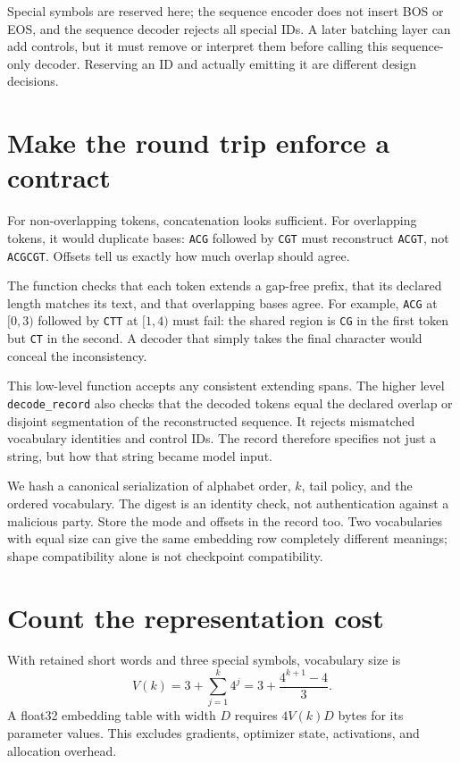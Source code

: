 Special symbols are reserved here; the sequence encoder does not insert
BOS or EOS, and the sequence decoder rejects all special IDs. A later
batching layer can add controls, but it must remove or interpret them
before calling this sequence-only decoder. Reserving an ID and actually
emitting it are different design decisions.

\section{Make the round trip enforce a contract}

For non-overlapping tokens, concatenation looks sufficient. For overlapping
tokens, it would duplicate bases: \texttt{ACG} followed by \texttt{CGT}
must reconstruct \texttt{ACGT}, not \texttt{ACGCGT}.
Offsets tell us exactly how much overlap should agree.


The function checks that each token extends a gap-free prefix, that its
declared length matches its text, and that overlapping bases agree.
For example, \texttt{ACG} at $[0,3)$ followed by \texttt{CTT} at $[1,4)$
must fail: the shared region is \texttt{CG} in the first token but
\texttt{CT} in the second. A decoder that simply takes the final character
would conceal the inconsistency.

This low-level function accepts any consistent extending spans. The higher
level \texttt{decode\_record} also checks that the decoded tokens equal the
declared overlap or disjoint segmentation of the reconstructed sequence.
It rejects mismatched vocabulary identities and control IDs. The record
therefore specifies not just a string, but how that string became model input.

We hash a canonical serialization of alphabet order, $k$, tail policy, and
the ordered vocabulary. The digest is an identity check, not authentication
against a malicious party. Store the mode and offsets in the record too.
Two vocabularies with equal size can give the same embedding row completely
different meanings; shape compatibility alone is not checkpoint compatibility.

\section{Count the representation cost}

With retained short words and three special symbols, vocabulary size is
\begin{equation}
V(k)=3+\sum_{j=1}^{k}4^j
=3+\frac{4^{k+1}-4}{3}.
\end{equation}
A float32 embedding table with width $D$ requires $4V(k)D$ bytes for its
parameter values. This excludes gradients, optimizer state, activations,
and allocation overhead.

